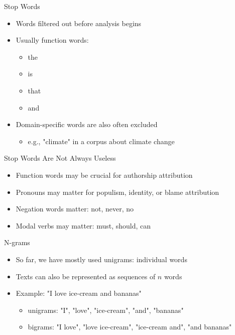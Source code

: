 \documentclass[11pt,aspectratio=43]{beamer}
\begin{document}
\begin{frame}{Stop Words}
\begin{itemize}
\item Words filtered out before analysis begins
\item Usually function words:
  \begin{itemize}\item the\item is\item that\item and\end{itemize}
\item Domain-specific words are also often excluded
  \begin{itemize}\item e.g., "climate" in a corpus about climate change\end{itemize}
\end{itemize}
\end{frame}

\begin{frame}{Stop Words Are Not Always Useless}
\begin{itemize}
\item Function words may be crucial for authorship attribution
\item Pronouns may matter for populism, identity, or blame attribution
\item Negation words matter: not, never, no
\item Modal verbs may matter: must, should, can
\end{itemize}
\end{frame}

\begin{frame}{N-grams}
\begin{itemize}
\item So far, we have mostly used unigrams: individual words
\item Texts can also be represented as sequences of $n$ words
\item Example: "I love ice-cream and bananas"
  \begin{itemize}
  \item unigrams: "I", "love", "ice-cream", "and", "bananas"
  \item bigrams: "I love", "love ice-cream", "ice-cream and", "and bananas"
  \end{itemize}
\end{itemize}
\end{frame}
\end{document}
